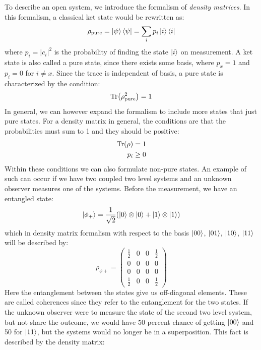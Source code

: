 To describe an open system, we introduce the formalism of \textit{density matrices}. In this formalism, a classical ket state would be rewritten as:
\begin{equation}
    \rho_{\text{pure}} = \ket{\psi}\bra{\psi} = \sum_i p_i \ket{i}\bra{i}
\end{equation}
where $p_i = |c_i|^2$ is the probability of finding the state $\ket{i}$ on measurement. A ket state is also called a pure state, since there exists some basis, where $p_x = 1$ and $p_i = 0$ for $i\neq x$. Since the trace is independent of basis, a pure state is characterized by the condition:
\begin{equation}
    \Tr(\rho_{\text{pure}}^2) = 1
\end{equation}
In general, we can however expand the formalism to include more states that just pure states. For a density matrix in general, the conditions are that the probabilities must sum to 1 and they should be positive:
\begin{align}
    \Tr(\rho) &= 1 \\
    p_i &\geq 0
\end{align}
Within these conditions we can also formulate non-pure states. An example of such can occur if we have two coupled two level systems and an unknown observer measures one of the systems. Before the measurement, we have an entangled state:
\begin{equation}\label{eq:phi_plus}
    \ket{\phi_+} = \frac{1}{\sqrt{2}}(\ket{0}\otimes \ket{0} + \ket{1}\otimes\ket{1})
\end{equation}
which in density matrix formalism with respect to the basis $\ket{00}$, $\ket{01}$, $\ket{10}$, $\ket{11}$ will be described by:
\begin{equation}
    \rho_{\phi+} = 
    \begin{pmatrix}
        \frac{1}{2} & 0 & 0 & \frac{1}{2} \\
        0 & 0 & 0 & 0 \\
        0 & 0 & 0 & 0 \\
        \frac{1}{2} & 0 & 0 & \frac{1}{2}
    \end{pmatrix}
\end{equation}
Here the entanglement between the states give us off-diagonal elements. These are called coherences since they refer to the entanglement for the two states. If the unknown observer were to measure the state of the second two level system, but not share the outcome, we would have 50 percent chance of getting $\ket{00}$ and 50 for $\ket{11}$, but the systems would no longer be in a superposition. This fact is described by the density matrix: 
